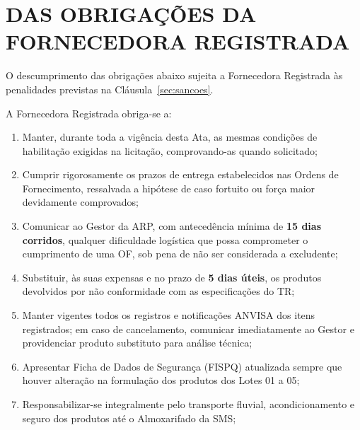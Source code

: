 \documentclass[12pt,a4paper]{article}
\begin{document}
\section{DAS OBRIGAÇÕES DA FORNECEDORA REGISTRADA}

\begin{warnbox}
\small
O descumprimento das obrigações abaixo sujeita a Fornecedora Registrada às
penalidades previstas na Cláusula~\ref{sec:sancoes}.
\end{warnbox}

A Fornecedora Registrada obriga-se a:

\begin{enumerate}
  \item Manter, durante toda a vigência desta Ata, as mesmas condições de
    habilitação exigidas na licitação, comprovando-as quando solicitado;

  \item Cumprir rigorosamente os prazos de entrega estabelecidos nas Ordens
    de Fornecimento, ressalvada a hipótese de caso fortuito ou força maior
    devidamente comprovados;

  \item Comunicar ao Gestor da ARP, com antecedência mínima de \textbf{15 dias
    corridos}, qualquer dificuldade logística que possa comprometer o cumprimento
    de uma OF, sob pena de não ser considerada a excludente;

  \item Substituir, às suas expensas e no prazo de \textbf{5 dias úteis},
    os produtos devolvidos por não conformidade com as especificações do TR;

  \item Manter vigentes todos os registros e notificações ANVISA dos itens
    registrados; em caso de cancelamento, comunicar imediatamente ao Gestor e
    providenciar produto substituto para análise técnica;

  \item Apresentar Ficha de Dados de Segurança (FISPQ) atualizada sempre que
    houver alteração na formulação dos produtos dos Lotes 01 a 05;

  \item Responsabilizar-se integralmente pelo transporte fluvial,
    acondicionamento e seguro dos produtos até o Almoxarifado da SMS;


\end{enumerate}
\end{document}
